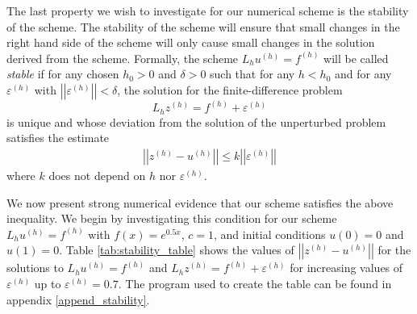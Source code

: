 The last property we wish to investigate for our numerical scheme is the
stability of the scheme. The stability of the scheme will ensure that small
changes in the right hand side of the scheme will only cause small changes in
the solution derived from the scheme. Formally, the scheme $L_h u^{(h)} = f^{(h)}$
will be called \textit{stable} if for any chosen $h_0 > 0$ and $\delta > 0$ such
that for any $h < h_0$ and for any $\varepsilon^{(h)}$ with
$\left|\left| \varepsilon^{(h)} \right|\right| < \delta$, the solution for the
finite-difference problem
$$L_h z^{(h)} = f^{(h)} + \varepsilon^{(h)}$$
is unique and whose deviation from the solution of the unperturbed problem satisfies
the estimate
\begin{align}\label{stability_ineq}
  \left|\left| z^{(h)} - u^{(h)} \right|\right| \leq k \left|\left| \varepsilon^{(h)} \right|\right|
\end{align}
where $k$ does not depend on $h$ nor $\varepsilon^{(h)}$.

We now present strong numerical evidence that our scheme satisfies the above
inequality.
We begin by investigating this condition for our scheme $L_h u^{(h)} = f^{(h)}$ with
$f(x) = e^{0.5x}$, $c=1$, and initial conditions $u(0) = 0$ and $u(1) = 0$. Table
\ref{tab:stability_table} shows the values of $\left|\left|z^{(h)} - u^{(h)}\right|\right|$
for the solutions to $L_h u^{(h)} = f^{(h)}$ and
$L_h z^{(h)} = f^{(h)} + \varepsilon^{(h)}$ for increasing values of
$\varepsilon^{(h)}$ up to $\varepsilon^{(h)} = 0.7$. The program used to create
the table can be found in appendix \ref{append_stability}.

